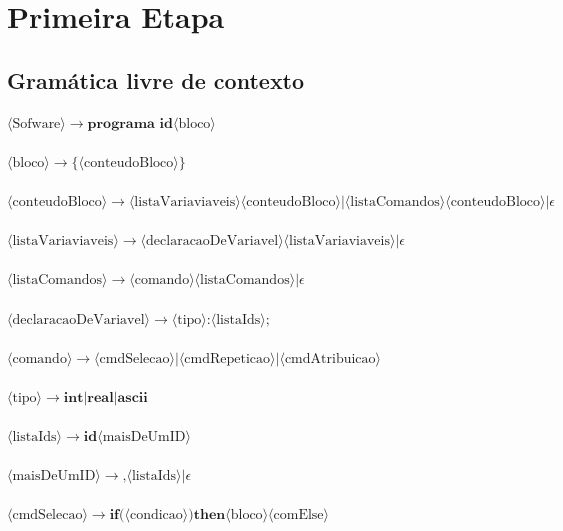 \documentclass[11pt]{article}
\begin{document}
\section*{Primeira Etapa}

\subsection*{Gramática livre de contexto}


$\langle \text{Sofware} \rangle \rightarrow \textbf{programa } \textbf{id} \langle\text{bloco}\rangle$\\\\
$\langle\text{bloco}\rangle \rightarrow \textbf{\{} \langle\text{conteudoBloco}\rangle \textbf{\}}$\\\\
$\langle\text{conteudoBloco}\rangle \rightarrow \langle\text{listaVariaviaveis}\rangle \langle\text{conteudoBloco}\rangle | \langle\text{listaComandos}\rangle \langle\text{conteudoBloco}\rangle | \epsilon $\\\\
$\langle\text{listaVariaviaveis}\rangle \rightarrow \langle\text{declaracaoDeVariavel}\rangle \langle\text{listaVariaviaveis}\rangle | \epsilon $\\\\
$\langle\text{listaComandos}\rangle \rightarrow \langle\text{comando}\rangle \langle\text{listaComandos}\rangle | \epsilon $\\\\
$\langle\text{declaracaoDeVariavel}\rangle  \rightarrow \langle\text{tipo}\rangle \textbf{:} \langle\text{listaIds}\rangle \textbf{;}$\\\\
$\langle\text{comando}\rangle \rightarrow \langle\text{cmdSelecao}\rangle|\langle\text{cmdRepeticao}\rangle|\langle\text{cmdAtribuicao}\rangle$\\\\
$\langle\text{tipo}\rangle  \rightarrow \textbf{int} | \textbf{real} | \textbf{ascii} $\\\\
$\langle\text{listaIds}\rangle \rightarrow \textbf{id} \langle\text{maisDeUmID} \rangle$\\\\
$\langle\text{maisDeUmID}\rangle \rightarrow \textbf{,}\langle\text{listaIds}\rangle  | \epsilon$\\\\
$\langle\text{cmdSelecao}\rangle \rightarrow \textbf{if(} \langle\text{condicao}\rangle \textbf{)then} \langle\text{bloco}\rangle \langle \text{comElse} \rangle$\\\\
\end{document}
